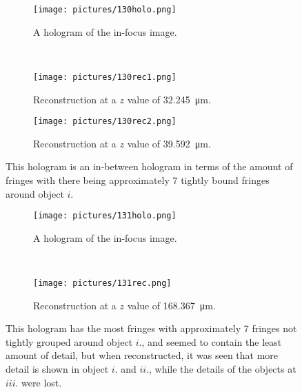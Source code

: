 \begin{figure}[ht!]
    \begin{center}

        \begin{subfigure}[t]{0.4\textwidth}
            \label{fig:130holo}
            \texttt{[image: pictures/130holo.png]}
            \caption{A hologram of the in-focus image.}
        \end{subfigure}
        \\
        \begin{subfigure}[t]{0.4\textwidth}
            \label{fig:130rec1}
            \texttt{[image: pictures/130rec1.png]}
            \caption{Reconstruction at a $z$ value of \SI{32.245}{\micro\meter}.}
        \end{subfigure}
                \hspace*{\fill}
%
        \begin{subfigure}[t]{0.4\textwidth}
            \label{fig:130rec2}
            \texttt{[image: pictures/130rec2.png]}
            \caption{Reconstruction at a $z$ value of \SI{39.592}{\micro\meter}.}
        \end{subfigure}


    \end{center}
    \caption{%
        This hologram is an in-between hologram in terms of the amount of
        fringes with there being approximately 7 tightly bound fringes around
        object $i.$
    }%
    \label{fig:130}
\end{figure}


\begin{figure}[ht!]
    \begin{center}

        \begin{subfigure}[t]{0.4\textwidth}
            \label{fig:131holo}
            \texttt{[image: pictures/131holo.png]}
            \caption{A hologram of the in-focus image.}
        \end{subfigure}
        \\
        \begin{subfigure}[t]{0.9\textwidth}
            \label{fig:131rec}
            \texttt{[image: pictures/131rec.png]}
            \caption{Reconstruction at a $z$ value of \SI{168.367}{\micro\meter}.}
        \end{subfigure}

    \end{center}
    \caption{%
        This hologram has the most fringes with approximately 7 fringes not
        tightly grouped around object $i.$, and seemed to contain the least
        amount of detail, but when reconstructed, it was seen that more detail
        is shown in object $i.$ and $ii.$, while the details of the objects at $iii.$
        were lost.
    }%
    \label{fig:131}
\end{figure}

